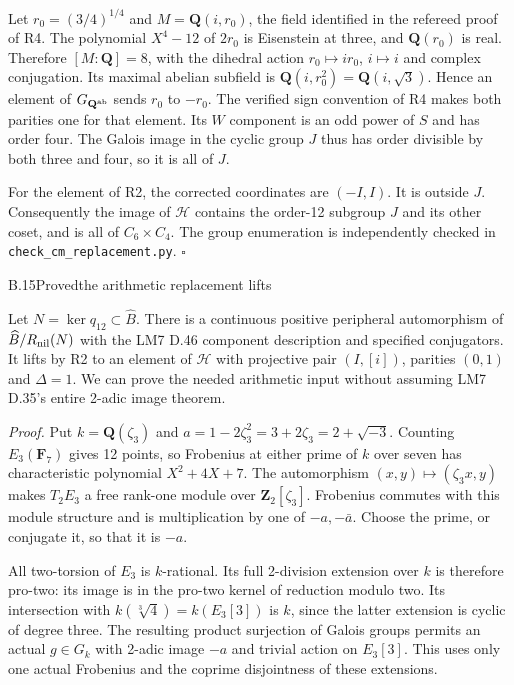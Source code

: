 Let $r_0=(3/4)^{1/4}$ and $M=\mathbf Q(i,r_0)$, the field
identified in the refereed proof of R4. The polynomial
$X^4-12$ of $2r_0$ is Eisenstein at three, and
$\mathbf Q(r_0)$ is real. Therefore $[M:\mathbf Q]=8$, with
the dihedral action $r_0\mapsto i r_0$, $i\mapsto i$ and
complex conjugation. Its maximal abelian subfield is
$\mathbf Q(i,r_0^2)=\mathbf Q(i,\sqrt3)$. Hence an element of
$G_{\mathbf Q^{\rm ab}}$ sends $r_0$ to $-r_0$. The verified
sign convention of R4 makes both parities one for that element.
Its $W$ component is an odd power of $S$ and has order four.
The Galois image in the cyclic group $J$ thus has order divisible
by both three and four, so it is all of $J$.

For the element of R2, the corrected coordinates are $(-I,I)$.
It is outside $J$. Consequently the image of $\mathcal H$
contains the order-12 subgroup $J$ and its other coset, and is
all of $C_6\times C_4$. The group enumeration is independently
checked in \texttt{check\_cm\_replacement.py}. \hfill$\square$

\begin{statement}{B.15}{Proved}{the arithmetic replacement lifts}
\citep[Section 8.5]{LiftHainMatsumoto2003}
\end{statement}
Let $N=\ker q_{12}\subset\widehat B$. There is a continuous
positive peripheral automorphism of
$\widehat B/R_{\rm nil}(N)$ with the LM7 D.46 component
description and specified conjugators. It lifts by R2 to an
element of $\mathcal H$ with projective pair $(I,[i])$, parities
$(0,1)$ and $\Delta=1$. We can prove the needed arithmetic
input without assuming LM7 D.35's entire 2-adic image theorem.

\emph{Proof.}
Put $k=\mathbf Q(\zeta_3)$ and
$a=1-2\zeta_3^2=3+2\zeta_3=2+\sqrt{-3}$. Counting
$E_3(\mathbf F_7)$ gives 12 points, so Frobenius at either
prime of $k$ over seven has characteristic polynomial
$X^2+4X+7$. The automorphism $(x,y)\mapsto(\zeta_3x,y)$
makes $T_2E_3$ a free rank-one module over
$\mathbf Z_2[\zeta_3]$. Frobenius commutes with this module
structure and is multiplication by one of $-a,-\bar a$.
Choose the prime, or conjugate it, so that it is $-a$.

All two-torsion of $E_3$ is $k$-rational. Its full 2-division
extension over $k$ is therefore pro-two: its image is in the
pro-two kernel of reduction modulo two. Its intersection with
$k(\sqrt[3]4)=k(E_3[3])$ is $k$, since the latter extension is
cyclic of degree three. The resulting product surjection of
Galois groups permits an actual $g\in G_k$ with 2-adic image
$-a$ and trivial action on $E_3[3]$. This uses only one actual
Frobenius and the coprime disjointness of these extensions.

